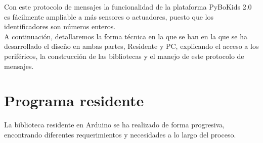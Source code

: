 Con este protocolo de mensajes la funcionalidad de la plataforma PyBoKids 2.0 es fácilmente ampliable a más sensores o actuadores, puesto que los identificadores son números enteros. \\

A continuación, detallaremos la forma técnica en la que se han en la que se ha desarrollado el diseño en ambas partes, Residente y PC, explicando el acceso a los periféricos, la construcción de las bibliotecas y el manejo de este protocolo de mensajes. 
\section{Programa residente}\label{sec:residente}
La biblioteca residente en Arduino se ha realizado de forma progresiva, encontrando diferentes requerimientos y necesidades a lo largo del proceso. 
